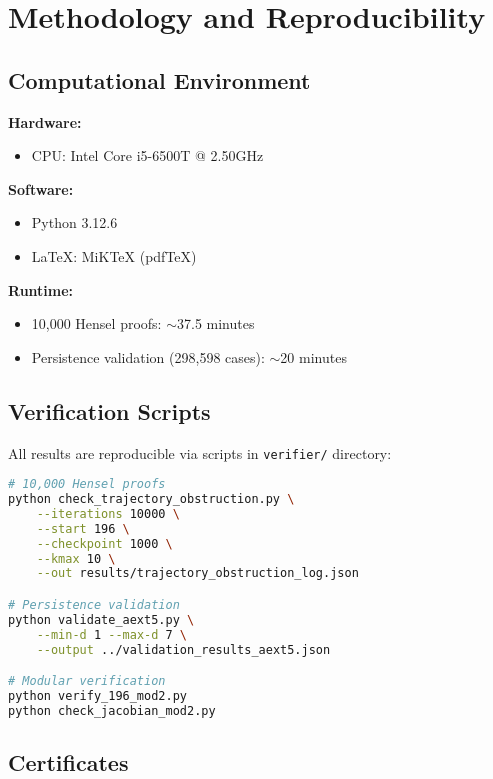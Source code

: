 \documentclass[11pt,a4paper]{article}
\theoremstyle{plain}
\theoremstyle{definition}
\begin{document}
\section{Methodology and Reproducibility}

\subsection{Computational Environment}

\textbf{Hardware:}
\begin{itemize}
\item CPU: Intel Core i5-6500T @ 2.50GHz
\end{itemize}

\textbf{Software:}
\begin{itemize}
\item Python 3.12.6
\item LaTeX: MiKTeX (pdfTeX)
\end{itemize}

\textbf{Runtime:}
\begin{itemize}
\item 10,000 Hensel proofs: $\sim$37.5 minutes
\item Persistence validation (298,598 cases): $\sim$20 minutes
\end{itemize}

\subsection{Verification Scripts}

All results are reproducible via scripts in \texttt{verifier/} directory:

\begin{lstlisting}[language=bash]
# 10,000 Hensel proofs
python check_trajectory_obstruction.py \
    --iterations 10000 \
    --start 196 \
    --checkpoint 1000 \
    --kmax 10 \
    --out results/trajectory_obstruction_log.json

# Persistence validation
python validate_aext5.py \
    --min-d 1 --max-d 7 \
    --output ../validation_results_aext5.json

# Modular verification
python verify_196_mod2.py
python check_jacobian_mod2.py
\end{lstlisting}

\subsection{Certificates}
\end{document}

